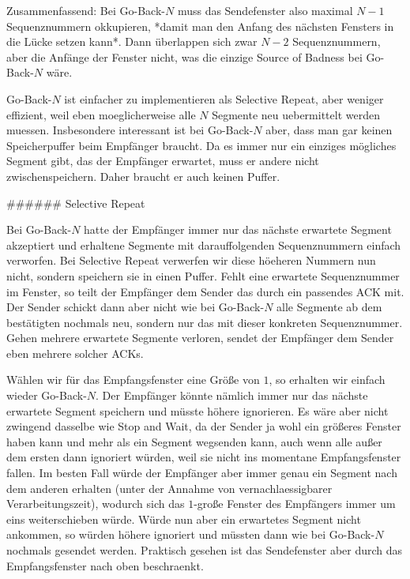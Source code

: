 Zusammenfassend: Bei Go-Back-$N$ muss das Sendefenster also maximal $N - 1$
Sequenznummern okkupieren, *damit man den Anfang des nächsten Fensters in die
Lücke setzen kann*. Dann überlappen sich zwar $N - 2$ Sequenznummern, aber die
Anfänge der Fenster nicht, was die einzige Source of Badness bei Go-Back-$N$
wäre.

Go-Back-$N$ ist einfacher zu implementieren als Selective Repeat, aber weniger
effizient, weil eben moeglicherweise alle $N$ Segmente neu uebermittelt werden
muessen. Insbesondere interessant ist bei Go-Back-$N$ aber, dass man gar keinen
Speicherpuffer beim Empfänger braucht. Da es immer nur ein einziges mögliches
Segment gibt, das der Empfänger erwartet, muss er andere nicht
zwischenspeichern. Daher braucht er auch keinen Puffer.

###### Selective Repeat

Bei Go-Back-$N$ hatte der Empfänger immer nur das nächste erwartete Segment
akzeptiert und erhaltene Segmente mit darauffolgenden Sequenznummern einfach
verworfen. Bei Selective Repeat verwerfen wir diese höeheren Nummern nun nicht,
sondern speichern sie in einen Puffer. Fehlt eine erwartete Sequenznummer im
Fenster, so teilt der Empfänger dem Sender das durch ein passendes ACK mit. Der
Sender schickt dann aber nicht wie bei Go-Back-$N$ alle Segmente ab dem
bestätigten nochmals neu, sondern nur das mit dieser konkreten
Sequenznummer. Gehen mehrere erwartete Segmente verloren, sendet der Empfänger
dem Sender eben mehrere solcher ACKs.

Wählen wir für das Empfangsfenster eine Größe von $1$, so erhalten wir einfach
wieder Go-Back-$N$. Der Empfänger könnte nämlich immer nur das nächste erwartete
Segment speichern und müsste höhere ignorieren. Es wäre aber nicht zwingend
dasselbe wie Stop and Wait, da der Sender ja wohl ein größeres Fenster haben
kann und mehr als ein Segment wegsenden kann, auch wenn alle außer dem ersten
dann ignoriert würden, weil sie nicht ins momentane Empfangsfenster fallen. Im
besten Fall würde der Empfänger aber immer genau ein Segment nach dem anderen
erhalten (unter der Annahme von vernachlaessigbarer Verarbeitungszeit), wodurch
sich das $1$-große Fenster des Empfängers immer um eins weiterschieben
würde. Würde nun aber ein erwartetes Segment nicht ankommen, so würden höhere
ignoriert und müssten dann wie bei Go-Back-$N$ nochmals gesendet
werden. Praktisch gesehen ist das Sendefenster aber durch das Empfangsfenster
nach oben beschraenkt.

